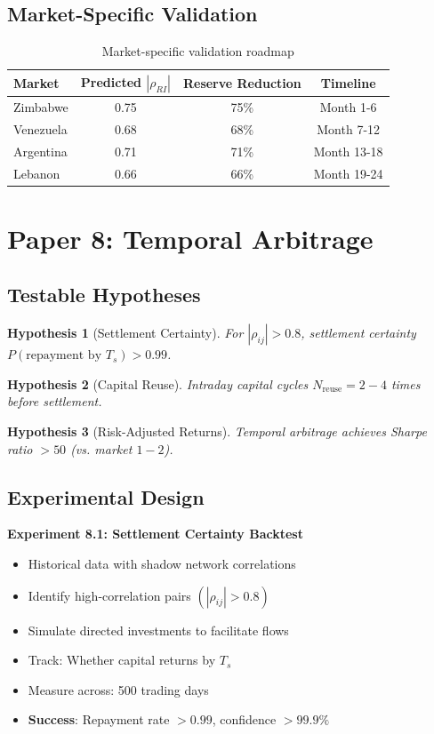 \documentclass[12pt]{article}
\newtheorem{hypothesis}{Hypothesis}
\begin{document}
\subsection{Market-Specific Validation}

\begin{table}[h]
\centering
\begin{tabular}{|l|c|c|c|}
\hline
Market & Predicted $|\rho_{RI}|$ & Reserve Reduction & Timeline \\
\hline
Zimbabwe & 0.75 & 75\% & Month 1-6 \\
Venezuela & 0.68 & 68\% & Month 7-12 \\
Argentina & 0.71 & 71\% & Month 13-18 \\
Lebanon & 0.66 & 66\% & Month 19-24 \\
\hline
\end{tabular}
\caption{Market-specific validation roadmap}
\end{table}

\section{Paper 8: Temporal Arbitrage}

\subsection{Testable Hypotheses}

\begin{hypothesis}[Settlement Certainty]
For $|\rho_{ij}| > 0.8$, settlement certainty $P(\text{repayment by } T_s) > 0.99$.
\end{hypothesis}

\begin{hypothesis}[Capital Reuse]
Intraday capital cycles $N_{\text{reuse}} = 2-4$ times before settlement.
\end{hypothesis}

\begin{hypothesis}[Risk-Adjusted Returns]
Temporal arbitrage achieves Sharpe ratio $> 50$ (vs. market $1-2$).
\end{hypothesis}

\subsection{Experimental Design}

\textbf{Experiment 8.1: Settlement Certainty Backtest}
\begin{itemize}
    \item Historical data with shadow network correlations
    \item Identify high-correlation pairs $(|\rho_{ij}| > 0.8)$
    \item Simulate directed investments to facilitate flows
    \item Track: Whether capital returns by $T_s$
    \item Measure across: 500 trading days
    \item \textbf{Success}: Repayment rate $> 0.99$, confidence $> 99.9\%$
\end{itemize}
\end{document}
